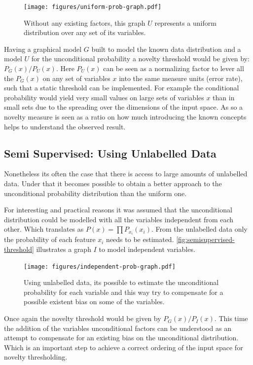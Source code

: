 \documentclass[runningheads,a4paper]{llncs}
\begin{document}
\begin{figure}
\centering
\texttt{[image: figures/uniform-prob-graph.pdf]}
\caption{\label{fig:uniform-prob-graph}Without any existing factors, this graph $U$ represents a
         uniform distribution over any set of its variables.}
\end{figure}

Having a graphical model $G$ built to model the known data distribution and a model
$U$ for the unconditional probability a novelty threshold would be given by:
$P_G(x)/P_U(x)$.
Here $P_{U}(x)$ can be seen as a normalizing factor to lever all the $P_G(x)$ on any set of
variables $x$ into the same measure units (error rate), such that a static threshold can be implemented.
For example the conditional probability would yield very small values on large sets of variables
$x$ than in small sets due to the spreading over the dimensions of the input space.
As so a novelty measure is seen as a ratio on how much introducing the known concepts helps to
understand the observed result.


\subsection{Semi Supervised: Using Unlabelled Data}
Nonetheless its often the case that there is access to large amounts of unlabelled data.
Under that it becomes possible to obtain a better approach to the unconditional probability
distribution than the uniform one.

For interesting and practical reasons it was assumed that the unconditional distribution
could be modelled with all the variables independent from each other.
Which translates as $P(x)=\prod{P_{x_i}(x_i)}$.
From the unlabelled data only the probability of each feature $x_i$ needs to be estimated.
\autoref{fig:semisupervised-threshold} illustrates a graph $I$ to model independent variables.

\begin{figure}[h]
\centering
\texttt{[image: figures/independent-prob-graph.pdf]}
\caption{\label{fig:semisupervised-threshold}Using unlabelled data, its possible to estimate
         the unconditional probability for each variable and this way try to compensate
         for a possible existent bias on some of the variables.}
\end{figure}

Once again the novelty threshold would be given by $P_G(x)/P_I(x)$.
This time the addition of the variables unconditional factors can be understood as an
attempt to compensate for an existing bias on the unconditional distribution.
Which is an important step to achieve a correct ordering of the input space for novelty
thresholding.
\end{document}
